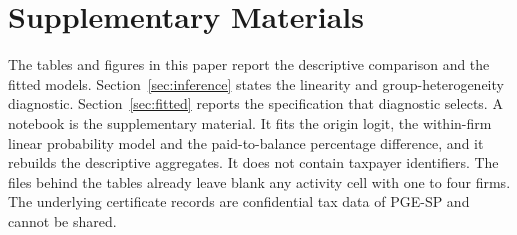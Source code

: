 \section*{Supplementary Materials}\label{sec:supplement}

The tables and figures in this paper report the descriptive comparison and the fitted models.
Section~\ref{sec:inference} states the linearity and group-heterogeneity diagnostic.
Section~\ref{sec:fitted} reports the specification that diagnostic selects.
A notebook is the supplementary material.
It fits the origin logit, the within-firm linear probability model and the paid-to-balance percentage difference, and it rebuilds the descriptive aggregates.
It does not contain taxpayer identifiers.
The files behind the tables already leave blank any activity cell with one to four firms.
The underlying certificate records are confidential tax data of PGE-SP and cannot be shared.
